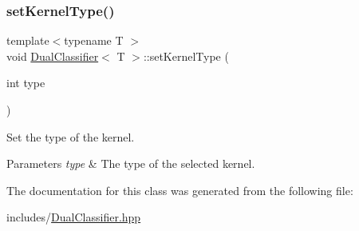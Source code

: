\subsubsection{\texorpdfstring{set\+Kernel\+Type()}{setKernelType()}}
{\footnotesize\ttfamily template$<$typename T $>$ \\
void \mbox{\hyperlink{class_dual_classifier}{Dual\+Classifier}}$<$ T $>$\+::set\+Kernel\+Type (\begin{DoxyParamCaption}\item[{int}]{type }\end{DoxyParamCaption})\hspace{0.3cm}{\ttfamily [inline]}}



Set the type of the kernel. 


\begin{DoxyParams}{Parameters}
{\em type} & The type of the selected kernel. \\
\hline
\end{DoxyParams}


The documentation for this class was generated from the following file\+:\begin{DoxyCompactItemize}
\item 
includes/\mbox{\hyperlink{_dual_classifier_8hpp}{Dual\+Classifier.\+hpp}}\end{DoxyCompactItemize}
